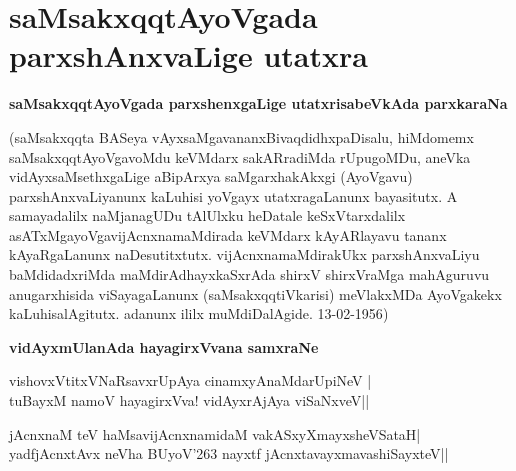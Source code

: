 \chapter{saMsakxqqtAyoVgada parxshAnxvaLige utatxra}

\noindent
{\large\bf saMsakxqqtAyoVgada parxshenxgaLige utatxrisabeVkAda parxkaraNa}\label{page19}
\medskip

\noindent
(saMsakxqqta BASeya vAyxsaMgavananxBivaqdidhxpaDisalu, hiMdomemx saMsakxqqtAyoVga\-voMdu keVMdarx sakAR\-radiMda rUpugoMDu, aneVka vidAyxsaMsethxgaLige aBipArxya saMgarxhakAkxgi (AyoVgavu) parxshAnxvaLiyanunx kaLuhisi yoVgayx utatxragaLanunx bayasitutx. A samayadalilx naMjanagUDu tAlUlxku heDatale keSxVtarxdalilx asATxMgayoVgavijAcnxnamaMdirada keVMdarx kAyARlayavu tananx kAyaRgaLanunx naDesutitxtutx. vijAcnxna\-maMdirakUkx  parxshAnxvaLiyu baMdidadxriMda maMdirAdhayxkaSxrAda shirxV shirxVraMga mahAguruvu anugarxhisida viSayagaLanunx (saMsakxqqtiVkarisi) meVlakxMDa AyoVgakekx kaLuhisalAgitutx. adanunx ililx muMdiDalAgide. {\rm 13-02-1956})  

\bigskip

\noindent
{\large\bf vidAyxmUlanAda hayagirxVvana samxraNe}\label{page19}
\medskip

\begin{shloka}
vishovxVtitxVNaRsavxrUpAya cinamxyAnaMdarUpiNeV |\\\label{19}
tuBayxM namoV hayagirxVva! vidAyxrAjAya viSaNxveV||
\end{shloka}

\begin{shloka}
jAcnxnaM teV haMsavijAcnxnamidaM vakASxyXmayxsheVSataH|\\\label{19}
yadfjAcnxtAvx neVha BUyoV\char'263 nayxtf jAcnxtavayxmavashiSayxteV||
\end{shloka}

